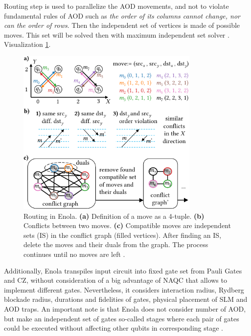 Routing step is used to parallelize the \ac{AOD} movements, 
and not to violate fundamental rules of \ac{AOD} such as \textit{the order of its columns cannot change, nor can
the order of rows}.
Then the independent set of vertices is made of possible moves. 
This set will be solved then with maximum independent set solver \parencite{Tan_2025_Enola}.
Visualization \ref{fig:routing_Enola}.
\begin{figure}[htbp]
  \centering
    \includegraphics[width=0.8\textwidth]{figures/routing_Enola.pdf}
    \caption[Routing in Enola]{Routing in Enola. 
    \textbf{(a)} Definition of a move as a 4-tuple. 
    \textbf{(b)} Conflicts between two moves. 
    \textbf{(c)} Compatible moves are independent sets (IS) in the conflict graph (filled vertices).
    After finding an IS, delete the moves and their duals from
    the graph. The process continues until no moves are left \parencite{Tan_2025_Enola}.}
    \label{fig:routing_Enola}
\end{figure}

Additionally, Enola transpiles input circuit into fixed gate set from Pauli Gates and CZ, 
without consideration of a big advantage of \ac{NAQC} that allows to implement different gates.
Nevertheless, it considers interaction radius, Rydberg blockade radius, durations and fidelities of gates,
physical placement of \ac{SLM} and \ac{AOD} traps. 
An important note is that Enola does not consider number of \ac{AOD}, 
but make an independent set of gates so-called stages where each pair of gates could be executed without affecting other qubits in corresponding stage \parencite{Tan_2025_Enola}.

